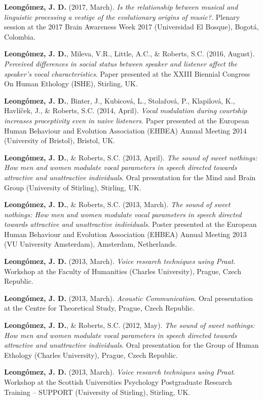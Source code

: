 \documentclass[11pt,a4paper,]{awesome-cv}
\begin{document}
\textbf{Leongómez, J. D.} (2017, March). \emph{Is the relationship
between musical and linguistic processing a vestige of the evolutionary
origins of music?}. Plenary session at the 2017 Brain Awareness Week
2017 (Universidad El Bosque), Bogotá, Colombia.

\textbf{Leongómez, J. D.}, Mileva, V.R., Little, A.C., \& Roberts, S.C.
(2016, August). \emph{Perceived differences in social status between
speaker and listener affect the speaker's vocal characteristics}. Paper
presented at the XXIII Biennial Congress On Human Ethology (ISHE),
Stirling, UK.

\textbf{Leongómez, J. D.}, Binter, J., Kubicová, L., Stolařová, P.,
Klapilová, K., Havlíček, J., \& Roberts, S.C. (2014, April). \emph{Vocal
modulation during courtship increases proceptivity even in naive
listeners}. Paper presented at the European Human Behaviour and
Evolution Association (EHBEA) Annual Meeting 2014 (University of
Bristol), Bristol, UK.

\textbf{Leongómez, J. D.}, \& Roberts, S.C. (2013, April). \emph{The
sound of sweet nothings: How men and women modulate vocal parameters in
speech directed towards attractive and unattractive individuals}. Oral
presentation for the Mind and Brain Group (University of Stirling),
Stirling, UK.

\textbf{Leongómez, J. D.}, \& Roberts, S.C. (2013, March). \emph{The
sound of sweet nothings: How men and women modulate vocal parameters in
speech directed towards attractive and unattractive individuals}. Poster
presented at the European Human Behaviour and Evolution Association
(EHBEA) Annual Meeting 2013 (VU University Amsterdam), Amsterdam,
Netherlands.

\textbf{Leongómez, J. D.} (2013, March). \emph{Voice research techniques
using Praat}. Workshop at the Faculty of Humanities (Charles
University), Prague, Czech Republic.

\textbf{Leongómez, J. D.} (2013, March). \emph{Acoustic Communication}.
Oral presentation at the Centre for Theoretical Study, Prague, Czech
Republic.

\textbf{Leongómez, J. D.}, \& Roberts, S.C. (2012, May). \emph{The sound
of sweet nothings: How men and women modulate vocal parameters in speech
directed towards attractive and unattractive individuals}. Oral
presentation for the Group of Human Ethology (Charles University),
Prague, Czech Republic.

\textbf{Leongómez, J. D.} (2013, March). \emph{Voice research techniques
using Praat}. Workshop at the Scottish Universities Psychology
Postgraduate Research Training -- SUPPORT (University of Stirling),
Stirling, UK.
\end{document}
